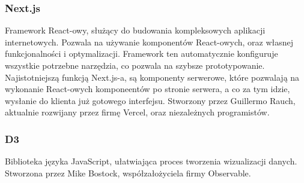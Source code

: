\documentclass[a4paper, 12pt]{article}
\begin{document}
\subsubsection{Next.js}
Framework React-owy, służący do budowania kompleksowych aplikacji internetowych. Pozwala na używanie komponentów React-owych, oraz własnej funkcjonalności i optymalizacji. Framework ten automatycznie konfiguruje wszystkie potrzebne narzędzia, co pozwala na szybsze prototypowanie. Najistotniejszą funkcją Next.js-a, są komponenty serwerowe, które pozwalają na wykonanie React-owych komponeentów po stronie serwera, a co za tym idzie, wysłanie do klienta już gotowego interfejsu.\cite{introNextjs} Stworzony przez Guillermo Rauch\cite{githubNextjsInit}, aktualnie rozwijany przez firmę Vercel, oraz niezależnych programistów.\cite{githubNextjsContributors}
\subsubsection{D3}
Biblioteka języka JavaScript, ułatwiająca proces tworzenia wizualizacji danych.\cite{homeD3} Stworzona przez Mike Bostock, współzałożyciela firmy Observable.\cite{githubD3Init}

\printbibliography
\end{document}
